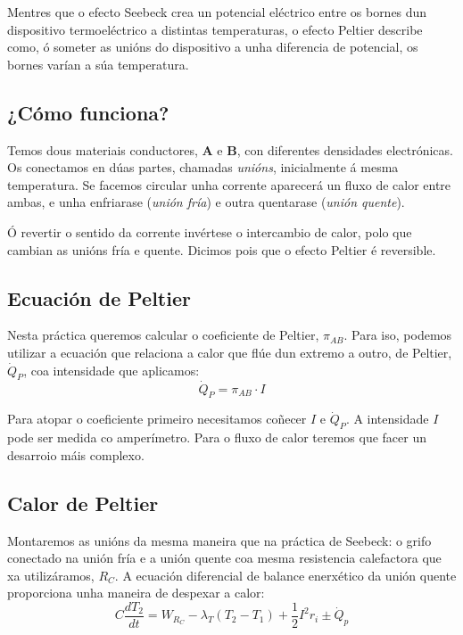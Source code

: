 \documentclass[12pt, a4paper, titlepage]{article}
\begin{document}
  Mentres que o efecto Seebeck crea un potencial eléctrico entre os bornes dun dispositivo termoeléctrico a distintas temperaturas, o efecto Peltier describe como, ó someter as unións do dispositivo a unha diferencia de potencial, os bornes varían a súa temperatura.

  \subsection{¿Cómo funciona?}

  Temos dous materiais conductores, \textbf{A} e \textbf{B}, con diferentes densidades electrónicas. Os conectamos en dúas partes, chamadas \textit{unións}, inicialmente á mesma temperatura.
  Se facemos circular unha corrente aparecerá un fluxo de calor entre ambas, e unha enfriarase (\textit{unión fría}) e outra quentarase (\textit{unión quente}).

  Ó revertir o sentido da corrente invértese o intercambio de calor, polo que cambian as unións fría e quente. Dicimos pois que o efecto Peltier é reversible.

  \subsection{Ecuación de Peltier}

  Nesta práctica queremos calcular o coeficiente de Peltier, $\pi_{AB}$. Para iso, podemos utilizar a ecuación que relaciona a calor que flúe dun extremo a outro, de Peltier, $\dot{Q}_P$, coa intensidade que aplicamos:
  \begin{equation}
    \dot{Q}_P = \pi_{AB} \cdot I
    \label{ec:peltier}
  \end{equation}

  Para atopar o coeficiente primeiro necesitamos coñecer $I$ e $\dot{Q}_P$. A intensidade $I$ pode ser medida co amperímetro. Para o fluxo de calor teremos que facer un desarroio máis complexo.

  \subsection{Calor de Peltier}

  Montaremos as unións da mesma maneira que na práctica de Seebeck: o grifo conectado na unión fría e a unión quente coa mesma resistencia calefactora que xa utilizáramos, $R_C$. A ecuación diferencial de balance enerxético da unión quente proporciona unha maneira de despexar a calor:
  \begin{equation}
    C \frac{dT_2}{dt} = W_{R_C} - \lambda_T(T_2 - T_1) + \frac{1}{2} I^2 r_i \pm \dot{Q}_p
    \label{ec:balance_enerxetico}
  \end{equation}
\end{document}
